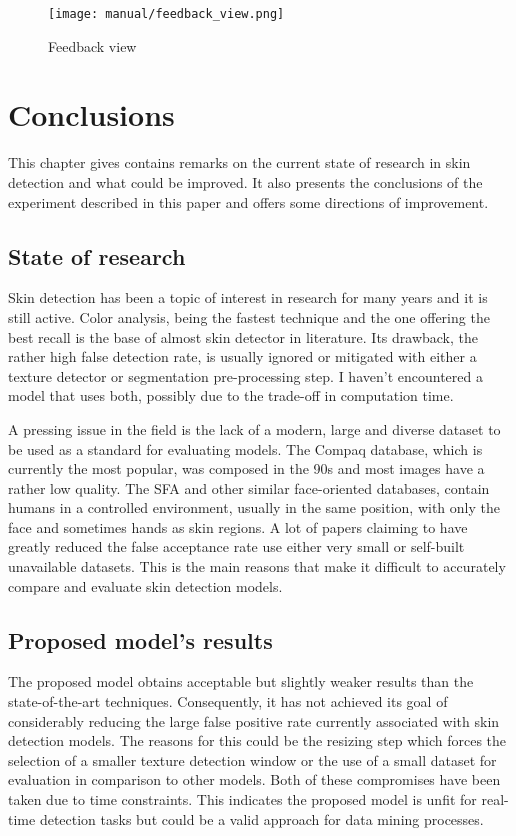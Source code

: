 \documentclass[12pt]{report}
\begin{document}
	
	\begin{figure}[h!]
		\centering
		\texttt{[image: manual/feedback\_view.png]}
		\caption{Feedback view}
		\label{feedback_view}
	\end{figure}

	\chapter{Conclusions}
	This chapter gives contains remarks on the current state of research in skin detection and what could be improved. It also presents the conclusions of the experiment described in this paper and offers some directions of improvement.
	
	\section{State of research}
	Skin detection has been a topic of interest in research for many years and it is still active. Color analysis, being the fastest technique and the one offering the best recall is the base of almost skin detector in literature. Its drawback, the rather high false detection rate, is usually ignored or mitigated with either a texture detector or segmentation pre-processing step. I haven't encountered a model that uses both, possibly due to the trade-off in computation time.
	
	A pressing issue in the field is the lack of a modern, large and diverse dataset to be used as a standard for evaluating models. The Compaq database, which is currently the most popular, was composed in the 90s and most images have a rather low quality. The SFA and other similar face-oriented databases, contain humans in a controlled environment, usually in the same position, with only the face and sometimes hands as skin regions. A lot of papers claiming to have greatly reduced the false acceptance rate use either very small or self-built unavailable datasets. This is the main reasons that make it difficult to accurately compare and evaluate skin detection models.
	
	\section{Proposed model's results}
	
	The proposed model obtains acceptable but slightly weaker results than the state-of-the-art techniques. Consequently, it has not achieved its goal of considerably reducing the large false positive rate currently associated with skin detection models. The reasons for this could be the resizing step which forces the selection of a smaller texture detection window or the use of a small dataset for evaluation in comparison to other models. Both of these compromises have been taken due to time constraints. This indicates the proposed model is unfit for real-time detection tasks but could be a valid approach for data mining processes.
	
\end{document}

